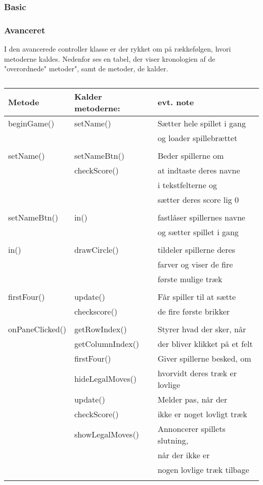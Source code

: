 \subsubsection{Basic}



\subsubsection{Avanceret}
I den avancerede controller klasse er der rykket om på rækkefølgen, hvori metoderne kaldes. Nedenfor ses en tabel, der viser kronologien af de "overordnede" metoder", samt de metoder, de kalder.
\begin{table}[H]
\centering
\caption{}\label{tbl:}
\begin{tabular}{lll}
\toprule
Metode & Kalder metoderne: & evt. note \\
\midrule
beginGame() & setName() & Sætter hele spillet i gang\\
&& og loader spillebrættet \\
& \\

setName() & setNameBtn() & Beder spillerne om \\ 
& checkScore() & at indtaste deres navne \\
&& i tekstfelterne og \\
&& sætter deres score lig 0\\
& \\

setNameBtn() & in() & fastlåser spillernes navne \\
&& og sætter spillet i gang\\
& \\

in() & drawCircle() & tildeler spillerne deres \\
&& farver og viser de fire \\
&& første mulige træk \\
& \\

firstFour() & update() & Får spiller til at sætte \\
& checkscore() & de fire første brikker\\
& \\

onPaneClicked() & getRowIndex() & Styrer hvad der sker, når \\ 
& getColumnIndex() & der bliver klikket på et felt\\
&  firstFour() & Giver spillerne besked, om \\
& hideLegalMoves() &hvorvidt deres træk er lovlige\\
& update() & Melder pas, når der \\ 
& checkScore() & ikke er noget lovligt træk\\
& showLegalMoves() & Annoncerer spillets slutning,\\ 
&& når der ikke er \\
&& nogen lovlige træk tilbage\\
& \\


\end{tabular}
\end{table}
